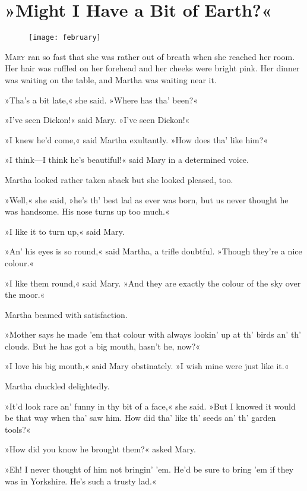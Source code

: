 \chapter{»Might I Have a Bit of Earth?«} 
	
\begin{figure}[t!]
\centering
\texttt{[image: february]}
\end{figure}

 \lettrine[lines=6]{M}{ary} ran so fast that she was rather out of breath when she reached her room. Her hair was ruffled on her forehead and her cheeks were bright pink. Her dinner was waiting on the table, and Martha was waiting near it.

\zz
»Tha's a bit late,« she said. »Where has tha' been?«

\zz
»I've seen Dickon!« said Mary. »I've seen Dickon!«

»I knew he'd come,« said Martha exultantly. »How does tha' like him?«

»I think—I think he's beautiful!« said Mary in a determined voice.

Martha looked rather taken aback but she looked pleased, too.

»Well,« she said, »he's th' best lad as ever was born, but us never thought he was handsome. His nose turns up too much.«

»I like it to turn up,« said Mary.

»An' his eyes is so round,« said Martha, a trifle doubtful. »Though they're a nice colour.«

»I like them round,« said Mary. »And they are exactly the colour of the sky over the moor.«

Martha beamed with satisfaction.

»Mother says he made 'em that colour with always lookin' up at th' birds an' th' clouds. But he has got a big mouth, hasn't he, now?«

»I love his big mouth,« said Mary obstinately. »I wish mine were just like it.«

Martha chuckled delightedly.

»It'd look rare an' funny in thy bit of a face,« she said. »But I knowed it would be that way when tha' saw him. How did tha' like th' seeds an' th' garden tools?«

»How did you know he brought them?« asked Mary.

»Eh! I never thought of him not bringin' 'em. He'd be sure to bring 'em if they was in Yorkshire. He's such a trusty lad.«

